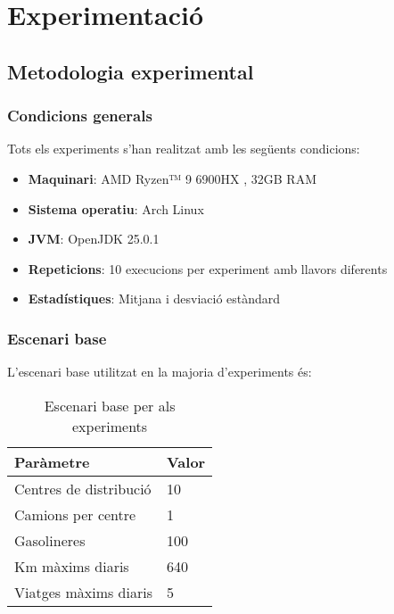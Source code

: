 \section{Experimentació}
\label{sec:experiments}

\vspace{0.5cm}

\subsection{Metodologia experimental}

\vspace{0.5cm}

\subsubsection{Condicions generals}

Tots els experiments s'han realitzat amb les següents condicions:

\begin{itemize}
    \item \textbf{Maquinari}: AMD Ryzen™ 9 6900HX , 32GB RAM
    \item \textbf{Sistema operatiu}: Arch Linux
    \item \textbf{JVM}: OpenJDK 25.0.1
    \item \textbf{Repeticions}: 10 execucions per experiment amb llavors diferents
    \item \textbf{Estadístiques}: Mitjana i desviació estàndard
\end{itemize}

\vspace{0.5cm}

\subsubsection{Escenari base}

L'escenari base utilitzat en la majoria d'experiments és:

\begin{table}[H]
\centering
\begin{tabular}{@{}ll@{}}
\toprule
\textbf{Paràmetre} & \textbf{Valor} \\
\midrule
Centres de distribució & 10 \\
Camions per centre & 1 \\
Gasolineres & 100 \\
Km màxims diaris & 640 \\
Viatges màxims diaris & 5 \\
\bottomrule
\end{tabular}
\caption{Escenari base per als experiments}
\label{tab:escenari-base}
\end{table}

